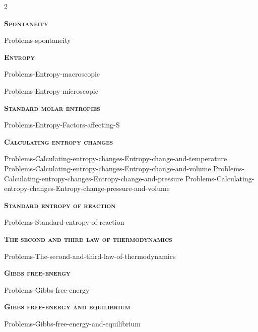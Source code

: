 \documentclass[main.tex]{subfiles}
\begin{document}
\newcommand\chapterlabel{Ch-thermo}
\newpage
{}
\fancyhfoffset[E,O]{0pt}
\setlength{\columnsep}{30pt}
\begin{conclusion}
\iftoggle{chem121}{}{\setcounter{chapter}{7}}
\end{conclusion}
\begin{multicols*}{2}\setcounter{numA}{1}  %

{\raggedright\textsc{\textbf{Spontaneity}}\par}
{Problems-spontaneity}


{\raggedright\textsc{\textbf{Entropy}}\par}
{Problems-Entropy-macroscopic}

{Problems-Entropy-microscopic}
{\raggedright\textsc{\textbf{Standard molar entropies}}\par}{Problems-Entropy-Factors-affecting-S}

{\raggedright\textsc{\textbf{Calculating entropy changes}}\par}{Problems-Calculating-entropy-changes-Entropy-change-and-temperature}
{Problems-Calculating-entropy-changes-Entropy-change-and-volume}
{Problems-Calculating-entropy-changes-Entropy-change-and-pressure}
  {Problems-Calculating-entropy-changes-Entropy-change-pressure-and-volume}

{\raggedright\textsc{\textbf{Standard entropy of reaction}}\par}{Problems-Standard-entropy-of-reaction}
{\raggedright\textsc{\textbf{The second and third law of thermodynamics}}\par}{Problems-The-second-and-third-law-of-thermodynamics}
{\raggedright\textsc{\textbf{Gibbs free-energy}}\par}{Problems-Gibbs-free-energy}
{\raggedright\textsc{\textbf{Gibbs free-energy and equilibrium}}\par}{Problems-Gibbs-free-energy-and-equilibrium}


\end{multicols*}
\end{document}
